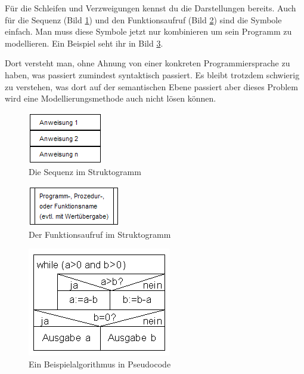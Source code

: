 Für die Schleifen und Verzweigungen kennst du die Darstellungen bereits. Auch für die Sequenz (Bild \ref{sequenz}) und den Funktionsaufruf (Bild \ref{call}) sind die Symbole einfach. Man muss diese Symbole jetzt nur kombinieren um sein Programm zu modellieren. Ein Beispiel seht ihr in Bild \ref{example}.

Dort versteht man, ohne Ahnung von einer konkreten Programmiersprache zu haben, was passiert zumindest syntaktisch passiert. Es bleibt trotzdem schwierig zu verstehen, was dort auf der semantischen Ebene passiert aber dieses Problem wird eine Modellierungsmethode auch nicht lösen können.

\begin{figure}
	\begin{center}\includegraphics[scale=1]{images/sequenz}\end{center}
	\caption{Die Sequenz im Struktogramm}
	\label{sequenz}
\end{figure}

\begin{figure}
	\begin{center}\includegraphics[scale=1]{images/call}\end{center}
	\caption{Der Funktionsaufruf im Struktogramm}
	\label{call}
\end{figure}

\begin{figure}
	\begin{center}\includegraphics[scale=0.75]{images/example}\end{center}
	\caption{Ein Beispielalgorithmus in Pseudocode}
	\label{example}
\end{figure}

